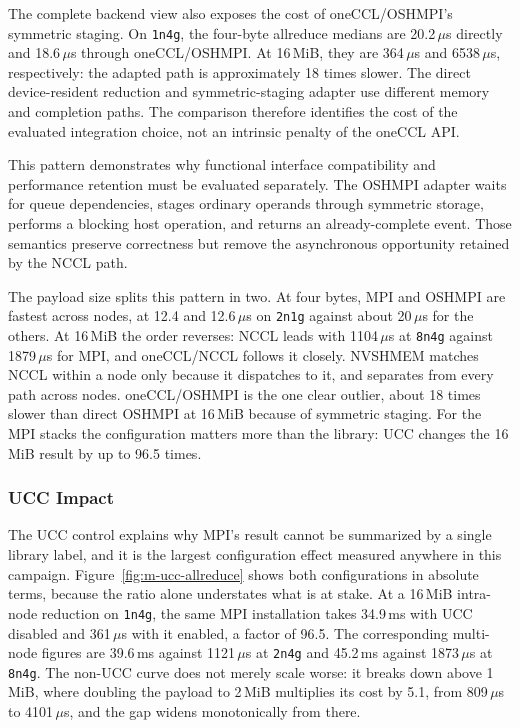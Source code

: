 \begin{table}[htbp]
\centering
\caption{Peak \texttt{allreduce} bus bandwidth in GB/s, recomputed as input bytes divided by allocation-median latency and multiplied by $2(P-1)/P$.}
\label{tab:m-allreduce-bandwidth}

\end{table}

The complete backend view also exposes the cost of oneCCL/OSHMPI's symmetric staging. On \texttt{1n4g}, the four-byte allreduce medians are 20.2\,$\mu$s directly and 18.6\,$\mu$s through oneCCL/OSHMPI. At 16\,MiB, they are 364\,$\mu$s and 6538\,$\mu$s, respectively: the adapted path is approximately 18 times slower. The direct device-resident reduction and symmetric-staging adapter use different memory and completion paths. The comparison therefore identifies the cost of the evaluated integration choice, not an intrinsic penalty of the oneCCL API.

This pattern demonstrates why functional interface compatibility and performance retention must be evaluated separately. The OSHMPI adapter waits for queue dependencies, stages ordinary operands through symmetric storage, performs a blocking host operation, and returns an already-complete event. Those semantics preserve correctness but remove the asynchronous opportunity retained by the NCCL path.

\begin{keypoint}
The payload size splits this pattern in two. At four bytes, MPI and OSHMPI are fastest across nodes, at 12.4 and 12.6\,$\mu$s on \texttt{2n1g} against about 20\,$\mu$s for the others. At 16\,MiB the order reverses: NCCL leads with 1104\,$\mu$s at \texttt{8n4g} against 1879\,$\mu$s for MPI, and oneCCL/NCCL follows it closely. NVSHMEM matches NCCL within a node only because it dispatches to it, and separates from every path across nodes. oneCCL/OSHMPI is the one clear outlier, about 18 times slower than direct OSHMPI at 16\,MiB because of symmetric staging. For the MPI stacks the configuration matters more than the library: UCC changes the 16\,MiB result by up to 96.5 times.
\end{keypoint}

\subsubsection{UCC Impact}

The UCC control explains why MPI's result cannot be summarized by a single library label, and it is the largest configuration effect measured anywhere in this campaign. Figure~\ref{fig:m-ucc-allreduce} shows both configurations in absolute terms, because the ratio alone understates what is at stake. At a 16\,MiB intra-node reduction on \texttt{1n4g}, the same MPI installation takes 34.9\,ms with UCC disabled and 361\,$\mu$s with it enabled, a factor of 96.5. The corresponding multi-node figures are 39.6\,ms against 1121\,$\mu$s at \texttt{2n4g} and 45.2\,ms against 1873\,$\mu$s at \texttt{8n4g}. The non-UCC curve does not merely scale worse: it breaks down above 1\,MiB, where doubling the payload to 2\,MiB multiplies its cost by 5.1, from 809\,$\mu$s to 4101\,$\mu$s, and the gap widens monotonically from there.

